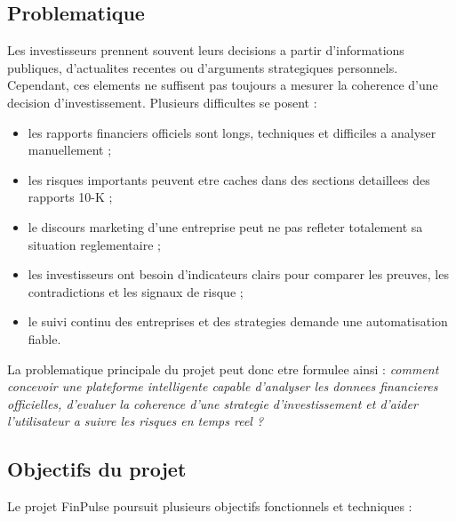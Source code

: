 \subsection{Problematique}

Les investisseurs prennent souvent leurs decisions a partir d'informations publiques,
d'actualites recentes ou d'arguments strategiques personnels. Cependant, ces elements
ne suffisent pas toujours a mesurer la coherence d'une decision d'investissement.
Plusieurs difficultes se posent :

\begin{itemize}
    \item les rapports financiers officiels sont longs, techniques et difficiles a
    analyser manuellement ;
    \item les risques importants peuvent etre caches dans des sections detaillees des
    rapports 10-K ;
    \item le discours marketing d'une entreprise peut ne pas refleter totalement sa
    situation reglementaire ;
    \item les investisseurs ont besoin d'indicateurs clairs pour comparer les preuves,
    les contradictions et les signaux de risque ;
    \item le suivi continu des entreprises et des strategies demande une automatisation
    fiable.
\end{itemize}

La problematique principale du projet peut donc etre formulee ainsi :
\textit{comment concevoir une plateforme intelligente capable d'analyser les donnees
financieres officielles, d'evaluer la coherence d'une strategie d'investissement et
d'aider l'utilisateur a suivre les risques en temps reel ?}

\subsection{Objectifs du projet}

Le projet FinPulse poursuit plusieurs objectifs fonctionnels et techniques :

